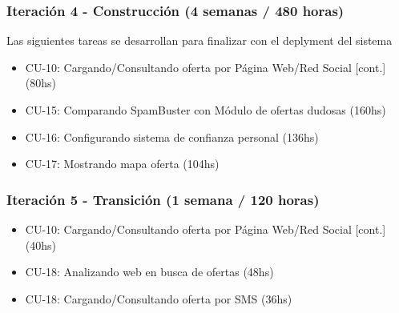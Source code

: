 \subsubsection{Iteraci\'on 4 - Construcci\'on (4 semanas / 480 horas)}
	
	Las siguientes tareas se desarrollan para finalizar con el deplyment del sistema
	
	\begin{itemize}
		  \item CU-10: Cargando/Consultando oferta por P\'agina Web/Red Social [cont.] (80hs)
		  \item CU-15: Comparando SpamBuster con M\'odulo de ofertas dudosas (160hs)
		  \item CU-16: Configurando sistema de confianza personal (136hs)
		  \item CU-17: Mostrando mapa oferta (104hs)
	\end{itemize}

\subsubsection{Iteraci\'on 5 - Transici\'on (1 semana / 120 horas)}
	
	\begin{itemize}
		  \item CU-10: Cargando/Consultando oferta por P\'agina Web/Red Social [cont.] (40hs)
		  \item CU-18: Analizando web en busca de ofertas (48hs)
		  \item CU-18: Cargando/Consultando oferta por SMS (36hs)
	\end{itemize}
